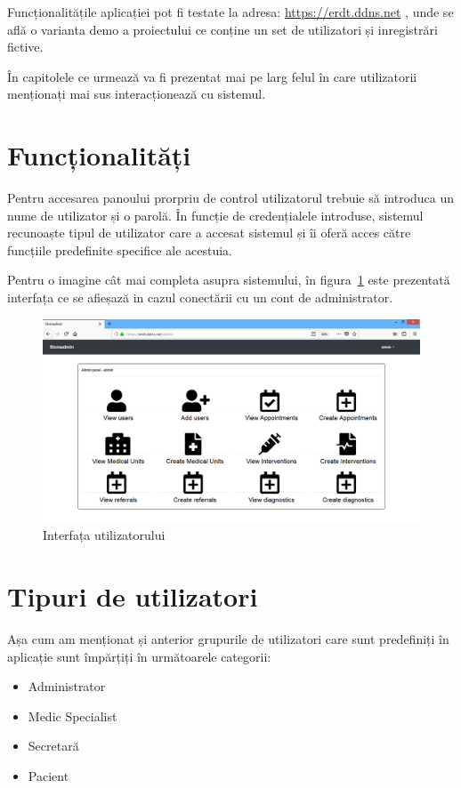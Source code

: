 \documentclass[a4paper,12pt]{article}
\begin{document}
Funcționalitățile aplicației pot fi testate la adresa: \url{https://erdt.ddns.net} , unde se află o varianta demo a proiectului ce conține un set de utilizatori și inregistrări fictive.

În capitolele ce urmează va fi prezentat mai pe larg felul în care utilizatorii menționați mai sus interacționează cu sistemul.

\section{Funcționalități}

Pentru accesarea panoului prorpriu de control utilizatorul trebuie să introduca un nume de utilizator și o parolă. În funcție de credențialele introduse, sistemul recunoaște tipul de utilizator care a accesat sistemul și îi oferă acces către funcțiile predefinite specifice ale acestuia.

Pentru o imagine cât mai completa asupra sistemului, în figura~\ref{fig:home} este prezentată interfața ce se afieșază in cazul conectării cu un cont de administrator.  

\begin{figure}[h]
\centering
\includegraphics[width=5in]{home}
\caption{Interfața utilizatorului}
\label{fig:home}
\end{figure}

\section{Tipuri de utilizatori}

Așa cum am menționat și anterior grupurile de utilizatori care sunt predefiniți în aplicație sunt împărțiți în următoarele categorii:
\begin{itemize}
\item Administrator
\item Medic Specialist
\item Secretară
\item Pacient
\end{itemize}
\end{document}
